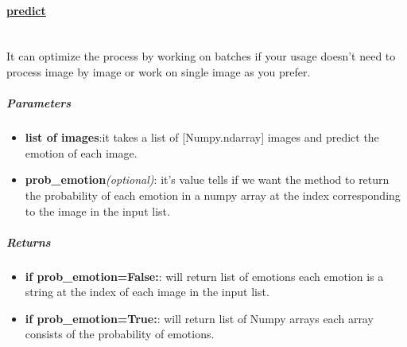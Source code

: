 \begin{comment}
\subparagraph{Usage:}
\begin{changemargin}{0.5cm}{0cm}
\begin{itemize}
\item import the module:
\begin{lstlisting}[language=Python]
from model.emotions_model import *\end{lstlisting}

\item create new object:
\begin{lstlisting}[language=Python]
model = EmotionsModel(
		verbose=False,
		create_new=False,
		use_hog=None,
		use_cnn=None,
		use_lm=None,
		emotions=None
)\end{lstlisting}

\end{itemize}
\end{changemargin}
\end{comment}
\hrulefill
\paragraph{\underline{predict}} \mbox{} \\
It can optimize the process by working on batches if your usage doesn't need to process image by image or work on single image as you prefer.

\subparagraph{Parameters}
\begin{changemargin}{0.5cm}{0cm}
\begin{itemize}
	\item \textbf{list of images}:it takes a list of [Numpy.ndarray] images and predict the emotion of each image.
	\item \textbf{prob\_emotion}\textit{(optional)}: it's value tells if we want the method to return the probability of each emotion in a numpy array at the index corresponding to the image in the input list. 
\end{itemize}
\end{changemargin}

\subparagraph{Returns}
\begin{changemargin}{0.5cm}{0cm}
\begin{itemize}[nolistsep]
	\item \textbf{if prob\_emotion=False:}:\newline
	will return list of emotions each emotion is a string at the index of each image in the input list.
	\item \textbf{if prob\_emotion=True:}:\newline
	will return list of Numpy arrays each array consists of the probability of emotions.
\end{itemize}
\end{changemargin}


